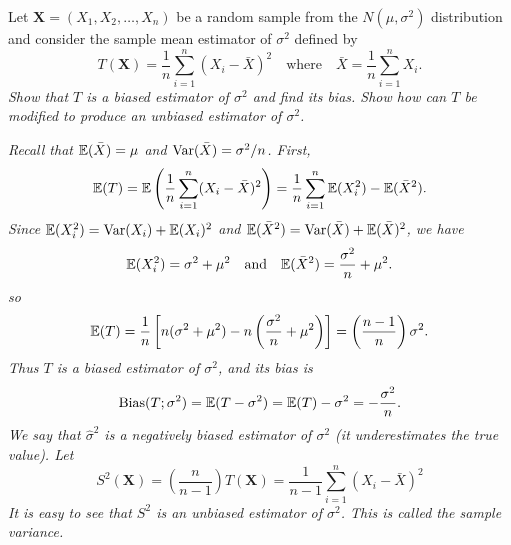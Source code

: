 \begin{example}
Let $\mathbf{X}=(X_1,X_2,\ldots,X_n)$ be a random sample from the $N(\mu,\sigma^2)$ distribution and consider the sample mean estimator of $\sigma^2$ defined by
\[
T(\mathbf{X}) = \frac{1}{n}\sum_{i=1}^n (X_i-\bar{X})^2 \quad\text{where}\quad \bar{X} = \frac{1}{n}\sum_{i=1}^n X_i.
\]
\ben
\it Show that $T$ is a biased estimator of $\sigma^2$ and find its bias.
\it Show how can $T$ be modified to produce an unbiased estimator of $\sigma^2$.
\een
\begin{solution}
\ben
\it %
Recall that $\mathbb{E}(\bar{X}) = \mu$ and $\text{Var}(\bar{X}) = \sigma^2/n$. First,
\[
\mathbb{E}(T)	= \mathbb{E}\left(\frac{1}{n}\sum_{i=1}^n (X_i-\bar{X})^2\right)
			= \frac{1}{n}\sum_{i=1}^n \mathbb{E}(X_i^2) - \mathbb{E}(\bar{X}^2).
\]
Since $\mathbb{E}(X_i^2)	= \text{Var}(X_i)+\mathbb{E}(X_i)^2$ and $\mathbb{E}(\bar{X}^2) = \text{Var}(\bar{X})+\mathbb{E}(\bar{X})^2$, we have
\[
\mathbb{E}(X_i^2) = \sigma^2 + \mu^2 \quad\text{and}\quad \mathbb{E}(\bar{X}^2) = \frac{\sigma^2}{n} + \mu^2.
\]
so
\[
\mathbb{E}(T) 
	= \frac{1}{n}\left[ n(\sigma^2+\mu^2)-n\left(\frac{\sigma^2}{n} + \mu^2\right)\right] 
	= \left(\frac{n-1}{n}\right)\sigma^2.
\]
Thus $T$ is a biased estimator of $\sigma^2$, and its bias is
\[
\text{Bias}(T;\sigma^2) = \mathbb{E}(T - \sigma^2) = \mathbb{E}(T) - \sigma^2 = -\frac{\sigma^2}{n}.
\]
We say that $\hat{\sigma}^2$ is a \emph{negatively biased} estimator of $\sigma^2$ (it underestimates the true value).
\it %
Let
\[
S^2(\mathbf{X}) = \left(\frac{n}{n-1}\right)T(\mathbf{X}) = \frac{1}{n-1}\sum_{i=1}^n (X_i-\bar{X})^2 
\]
It is easy to see that $S^2$ is an unbiased estimator of $\sigma^2$. This is called the \emph{sample variance}.
\een
\end{solution}
\end{example}

